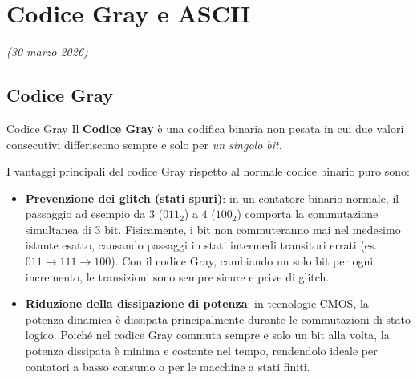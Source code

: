 \chapter{Codice Gray e ASCII}
\label{ch:gray-ascii}
\textit{(30 marzo 2026)}

\section{Codice Gray}

\begin{definizione}{Codice Gray}
Il \textbf{Codice Gray} è una codifica binaria non pesata in cui due valori consecutivi differiscono sempre e solo per \emph{un singolo bit}.
\end{definizione}

\noindent I vantaggi principali del codice Gray rispetto al normale codice binario puro sono:
\begin{itemize}[leftmargin=1.5em]
    \item \textbf{Prevenzione dei glitch (stati spuri)}: in un contatore binario normale, il passaggio ad esempio da $3$ ($011_2$) a $4$ ($100_2$) comporta la commutazione simultanea di 3 bit. Fisicamente, i bit non commuteranno mai nel medesimo istante esatto, causando passaggi in stati intermedi transitori errati (es. $011 \to 111 \to 100$). Con il codice Gray, cambiando un solo bit per ogni incremento, le transizioni sono sempre sicure e prive di glitch.
    \item \textbf{Riduzione della dissipazione di potenza}: in tecnologie CMOS, la potenza dinamica è dissipata principalmente durante le commutazioni di stato logico. Poiché nel codice Gray commuta sempre e solo un bit alla volta, la potenza dissipata è minima e costante nel tempo, rendendolo ideale per contatori a basso consumo o per le macchine a stati finiti.
\end{itemize}

